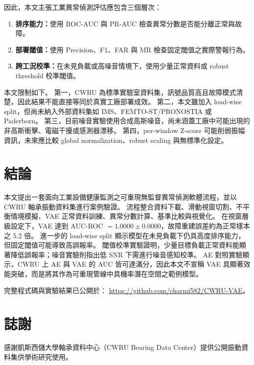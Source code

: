 \documentclass[conference,compsoc]{IEEEtran}
\begin{document}
因此，本文主張工業異常偵測評估應包含三個層次：
\begin{enumerate}
  \item \textbf{排序能力：}使用 ROC-AUC 與 PR-AUC 檢查異常分數是否能分離正常與故障。
  \item \textbf{部署閾值：}使用 Precision、F1、FAR 與 MR 檢查固定閾值之實際警報行為。
  \item \textbf{跨工況校準：}在未見負載或高噪音情境下，使用少量正常資料或 robust threshold 校準閾值。
\end{enumerate}

本文限制如下。
第一，CWRU 為標準實驗室資料集，訊號品質高且故障模式清楚，因此結果不能直接等同於真實工廠部署成效。
第二，本文雖加入 load-wise split，但尚未納入外部資料集如 IMS、FEMTO-ST/PRONOSTIA 或 Paderborn。
第三，目前噪音實驗使用合成高斯噪音，尚未涵蓋工廠中可能出現的非高斯衝擊、電磁干擾或感測器漂移。
第四，per-window Z-score 可能削弱振幅資訊，未來應比較 global normalization、robust scaling 與無標準化設定。

\section{結論}
本文提出一套面向工業設備健康監測之可重現無監督異常偵測軟體流程，並以 CWRU 軸承振動資料集進行案例驗證。
流程整合資料下載、滑動視窗切割、不平衡情境模擬、VAE 正常資料訓練、異常分數計算、基準比較與視覺化。
在視窗層級設定下，VAE 達到 AUC-ROC $=1.0000\pm0.0000$，故障重建誤差約為正常樣本之 5.2 倍。
進一步的 load-wise split 顯示模型在未見負載下仍具高度排序能力，但固定閾值可能導致高誤報率。
閾值校準實驗證明，少量目標負載正常資料能顯著降低誤報率；噪音實驗則指出低 SNR 下需進行噪音感知校準。
AE 對照實驗顯示，CWRU 上 AE 與 VAE 的 AUC 皆可達滿分，因此本文不宣稱 VAE 具顯著效能突破，而是將其作為可重現管線中具機率潛在空間之範例模型。

完整程式碼與實驗結果已公開於：
\url{https://github.com/charmi582/CWRU-VAE}。

\section*{誌謝}
感謝凱斯西儲大學軸承資料中心（CWRU Bearing Data Center）提供公開振動資料集供學術研究使用。
\end{document}
